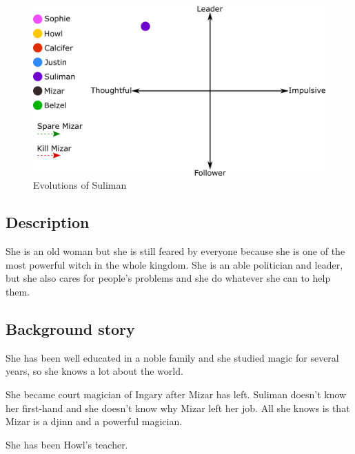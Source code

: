 \begin{figure}[H]
  \centering
   \includegraphics[width=14cm]{Images/Diagrams/Evolutions/sulimanEvolution}
  \caption{Evolutions of Suliman}
\end{figure}

\subsection{Description}
She is an old woman but she is still feared by everyone because she is one of the most powerful witch in the whole kingdom. She is an able politician and leader, but she also cares for people's problems and she do whatever she can to help them.

\subsection{Background story}
She has been well educated in a noble family and she studied magic for several years, so she knows a lot about the world.

She became court magician of Ingary after Mizar has left. Suliman doesn't know her first-hand and she doesn't know why Mizar left her job. All she knows is that Mizar is a djinn and a powerful magician.

She has been Howl's teacher.
